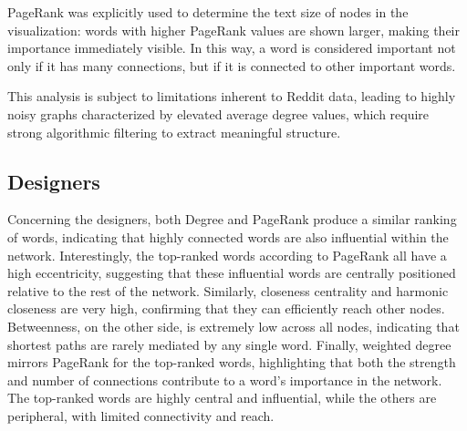 \documentclass[conference]{IEEEtran}
\begin{document}
PageRank was explicitly used to determine the text size of nodes in the visualization: words with higher PageRank values are shown larger, making their importance immediately visible. In this way, a word is considered important not only if it has many connections, but if it is connected to other important words.

This analysis is subject to limitations inherent to Reddit data, leading to highly noisy graphs characterized by elevated average degree values, which require strong algorithmic filtering to extract meaningful structure. 

\subsection{Designers}

Concerning the designers, both Degree and PageRank produce a similar ranking of words, indicating that highly connected words are also influential within the network. Interestingly, the top-ranked words according to PageRank all have a high eccentricity, suggesting that these influential words are centrally positioned relative to the rest of the network. Similarly, closeness centrality and harmonic closeness are very high, confirming that they can efficiently reach other nodes. Betweenness, on the other side, is extremely low across all nodes, indicating that shortest paths are rarely mediated by any single word. Finally, weighted degree mirrors PageRank for the top-ranked words, highlighting that both the strength and number of connections contribute to a word’s importance in the network. The top-ranked words are highly central and influential, while the others are peripheral, with limited connectivity and reach.
\end{document}
